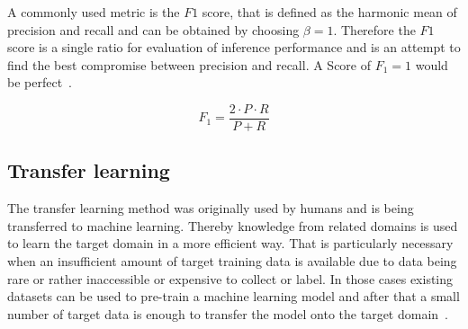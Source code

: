 A commonly used metric is the $F1$ score, that is defined as the harmonic mean of precision and 
recall and can be obtained by choosing $\beta = 1$. Therefore the $F1$ score is a single ratio for 
evaluation of inference performance and is an attempt to find the best compromise between 
precision and recall. A Score of $F_1 = 1$ would be perfect~\cite{skopal2005}.

\begin{equation}
	\label{eq:intro:f1}
	F_1 = \frac{2 \cdot P \cdot R}{P + R}
\end{equation}   

\subsection{Transfer learning}\label{subsec:intro:transferlearning}

The transfer learning method was originally used by humans and is being transferred to machine 
learning. Thereby knowledge from related domains is used to learn the target domain in a more 
efficient way. That is particularly necessary when an insufficient amount of target training data is 
available due to data being rare or rather inaccessible or expensive to collect or label. In those cases 
existing datasets can be used to pre-train a machine learning model and after that a small number of 
target data is enough to transfer the model onto the target domain~\cite{weiss2016}.